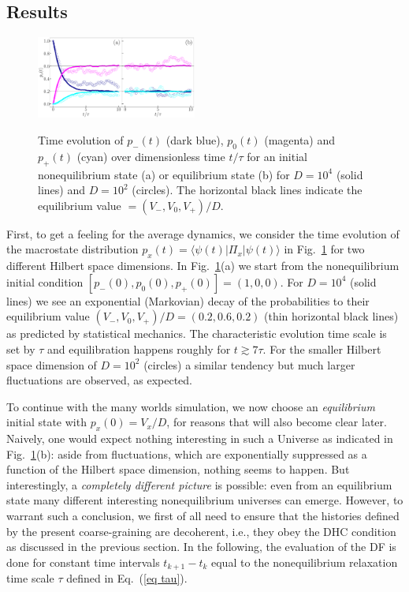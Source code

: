 \documentclass[pre,twocolumn,10pt,aps,longbibliography,nofootinbib]{revtex4-1}
\newcommand{\lr}[1]{{\langle {#1}\rangle}}
\newcommand{\blue}[1]{#1}
\newcommand{\new}[1]{#1}
\begin{document}
\subsection{Results}

\begin{figure}[tb]
 \centering\includegraphics[width=0.47\textwidth,clip=true]{dynamics.pdf}
 \label{fig dynamics}
 \caption{Time evolution of $p_-(t)$ (dark blue), $p_0(t)$ (magenta) and $p_+(t)$ (cyan) over dimensionless time
 $t/\tau$ for an initial nonequilibrium state (a) or equilibrium state (b) for $D=10^4$ (solid lines) and $D=10^2$ (circles). The horizontal black lines indicate the equilibrium value $= (V_-,V_0,V_+)/D$.  }
\end{figure}

First, to get a feeling for the average dynamics, we consider the time evolution of \new{the macrostate distribution $p_x(t) = \lr{\psi(t)|\Pi_x|\psi(t)}$} in Fig.~\ref{fig dynamics} \new{for two different Hilbert space dimensions. In Fig.~\ref{fig dynamics}(a) we start from the nonequilibrium initial condition $[p_-(0),p_0(0),p_+(0)] = (1,0,0)$. For $D=10^4$ (solid lines)} we see an exponential (Markovian) decay of the probabilities to their equilibrium value $(V_-,V_0,V_+)/D = (0.2,0.6,0.2)$ (thin horizontal black lines) as predicted by statistical mechanics. The characteristic evolution time scale is set by $\tau$ and equilibration happens roughly for $t\gtrsim7\tau$. \new{For the smaller Hilbert space dimension of $D=10^2$ (circles) a similar tendency but much larger fluctuations are observed, as expected.}

To continue with the many worlds simulation, we now choose an \emph{equilibrium} initial state with $p_x(0) = V_x/D$, for reasons that will also become clear \blue{later}. Naively, one would expect nothing interesting in such a Universe as indicated in Fig.~\ref{fig dynamics}(b): aside from fluctuations, \new{which are exponentially suppressed as a function of the Hilbert space dimension}, nothing seems to happen. But interestingly, a \emph{completely different picture} is possible: even from an equilibrium state many different interesting nonequilibrium universes \new{can} emerge. However, to warrant such a conclusion, we first of all need to ensure that the histories defined by the present coarse-graining are \new{decoherent}, i.e., they obey the DHC condition as discussed in the previous section. In the following, the evaluation of the DF is done for constant time intervals $t_{k+1}-t_k$ equal to the nonequilibrium relaxation time scale $\tau$ defined in Eq.~(\ref{eq tau}).
\end{document}
